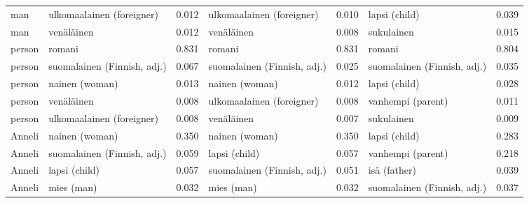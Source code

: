 \begin{longtable}{llrlrlr}
   man &   ulkomaalainen (foreigner) &                            0.012 &   ulkomaalainen (foreigner) &                                 0.010 &               lapsi (child) &                           0.039 \\
   man &                  venäläinen &                            0.012 &                  venäläinen &                                 0.008 &                  sukulainen &                           0.015 \\
person &                      romani &                            0.831 &                      romani &                                 0.831 &                      romani &                           0.804 \\
person & suomalainen (Finnish, adj.) &                            0.067 & suomalainen (Finnish, adj.) &                                 0.025 & suomalainen (Finnish, adj.) &                           0.035 \\
person &              nainen (woman) &                            0.013 &              nainen (woman) &                                 0.012 &               lapsi (child) &                           0.028 \\
person &                  venäläinen &                            0.008 &   ulkomaalainen (foreigner) &                                 0.008 &           vanhempi (parent) &                           0.011 \\
person &   ulkomaalainen (foreigner) &                            0.008 &                  venäläinen &                                 0.007 &                  sukulainen &                           0.009 \\
Anneli &              nainen (woman) &                            0.350 &              nainen (woman) &                                 0.350 &               lapsi (child) &                           0.283 \\
Anneli & suomalainen (Finnish, adj.) &                            0.059 &               lapsi (child) &                                 0.057 &           vanhempi (parent) &                           0.218 \\
Anneli &               lapsi (child) &                            0.057 & suomalainen (Finnish, adj.) &                                 0.051 &                isä (father) &                           0.039 \\
Anneli &                  mies (man) &                            0.032 &                  mies (man) &                                 0.032 & suomalainen (Finnish, adj.) &                           0.037 \\

\end{longtable}
